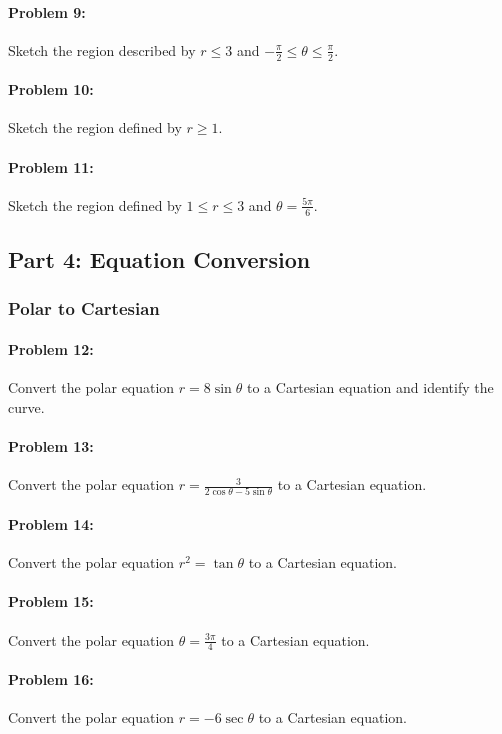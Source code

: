 \documentclass{article}
\begin{document}
\paragraph{Problem 9:} Sketch the region described by $r \le 3$ and $-\frac{\pi}{2} \le \theta \le \frac{\pi}{2}$.

\paragraph{Problem 10:} Sketch the region defined by $r \ge 1$.

\paragraph{Problem 11:} Sketch the region defined by $1 \le r \le 3$ and $\theta = \frac{5\pi}{6}$.

\subsection*{Part 4: Equation Conversion}

\subsubsection*{Polar to Cartesian}

\paragraph{Problem 12:} Convert the polar equation $r = 8\sin\theta$ to a Cartesian equation and identify the curve.

\paragraph{Problem 13:} Convert the polar equation $r = \frac{3}{2\cos\theta - 5\sin\theta}$ to a Cartesian equation.

\paragraph{Problem 14:} Convert the polar equation $r^2 = \tan\theta$ to a Cartesian equation.

\paragraph{Problem 15:} Convert the polar equation $\theta = \frac{3\pi}{4}$ to a Cartesian equation.

\paragraph{Problem 16:} Convert the polar equation $r = -6\sec\theta$ to a Cartesian equation.
\end{document}

